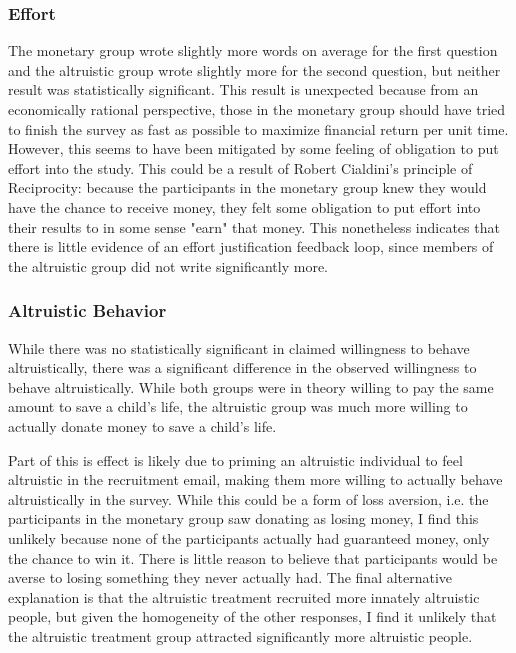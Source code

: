 \documentclass[12pt]{article}
\begin{document}
\subsubsection{Effort}
The monetary group wrote slightly more words on average for the first question and the altruistic group wrote slightly more for the second question, but neither result was statistically significant. This result is unexpected because from an economically rational perspective, those in the monetary group should have tried to finish the survey as fast as possible to maximize financial return per unit time. However, this seems to have been mitigated by some feeling of obligation to put effort into the study. This could be a result of Robert Cialdini's principle of Reciprocity: because the participants in the monetary group knew they would have the chance to receive money, they felt some obligation to put effort into their results to in some sense "earn" that money. This nonetheless indicates that there is little evidence of an effort justification feedback loop, since members of the altruistic group did not write significantly more. 

\subsubsection{Altruistic Behavior}
While there was no statistically significant in claimed willingness to behave altruistically, there was a significant difference in the observed willingness to behave altruistically. While both groups were in theory willing to pay the same amount to save a child's life, the altruistic group was much more willing to actually donate money to save a child's life. 

Part of this is effect is likely due to priming an altruistic individual to feel altruistic in the recruitment email, making them more willing to actually behave altruistically in the survey. While this could be a form of loss aversion, i.e. the participants in the monetary group saw donating as losing money, I find this unlikely because none of the participants actually had guaranteed money, only the chance to win it. There is little reason to believe that participants would be averse to losing something they never actually had. The final alternative explanation is that the altruistic treatment recruited more innately altruistic people, but given the homogeneity of the other responses, I find it unlikely that the altruistic treatment group attracted significantly more altruistic people. 
\end{document}
